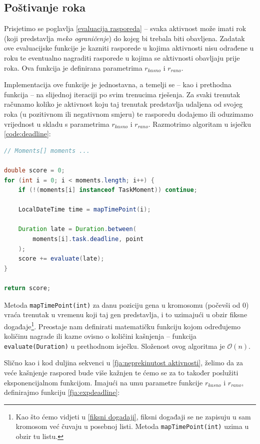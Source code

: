 \documentclass[times, utf8, zavrsni]{fer}
\begin{document}
\subsection{Poštivanje roka}\label{fja:postivanje roka}
Prisjetimo se poglavlja \ref{evaluacija rasporeda} -- svaka aktivnost može imati rok (koji predstavlja \textit{meko ograničenje}) do kojeg bi trebala biti obavljena. Zadatak ove evaluacijske funkcije je kazniti rasporede u kojima aktivnosti nisu odrađene u roku te eventualno nagraditi rasporede u kojima se aktivnosti obavljaju prije roka. Ova funkcija je definirana parametrima $r_{kasno}$ i $r_{rano}$.

Implementacija ove funkcije je jednostavna, a temelji se -- kao i prethodna funkcija -- na slijednoj iteraciji po svim trenucima rješenja. Za svaki trenutak računamo koliko je aktivnost koju taj trenutak predstavlja udaljena od svojeg roka (u pozitivnom ili negativnom smjeru) te rasporedu dodajemo ili oduzimamo vrijednost u skladu s parametrima $r_{kasno}$ i $r_{rano}$. Razmotrimo algoritam u isječku \ref{code:deadline}:

\begin{lstlisting}[language=java, caption=Algoritam određivanja kašnjenja trenutaka, label={code:deadline}]
// Moments[] moments ...

double score = 0;
for (int i = 0; i < moments.length; i++) {
    if (!(moments[i] instanceof TaskMoment)) continue;

    LocalDateTime time = mapTimePoint(i);

    Duration late = Duration.between(
    	moments[i].task.deadline, point
    );
    score += evaluate(late);
}

return score;
\end{lstlisting}
Metoda \texttt{mapTimePoint(int)} za danu poziciju gena u kromosomu (počevši od 0) vraća trenutak u vremenu koji taj gen predstavlja, i to uzimajući u obzir fiksne događaje\footnote{Kao što ćemo vidjeti u \ref{fiksni dogadaji}, fiksni događaji se ne zapisuju u sam kromosom već čuvaju u posebnoj listi. Metoda \texttt{mapTimePoint(int)} uzima u obzir tu listu.}. Preostaje nam definirati matematičku funkciju kojom određujemo količinu nagrade ili kazne ovisno o količini kašnjenja -- funkcija \texttt{evaluate(Duration)} u prethodnom isječku. Složenost ovog algoritma je $\mathcal{O}(n)$.

Slično kao i kod duljina sekvenci u \ref{fja:neprekinutost aktivnosti}, želimo da za veće kašnjenje raspored bude više kažnjen te ćemo se za to također poslužiti eksponencijalnom funkcijom. Imajući na umu parametre funkcije $r_{kasno}$ i $r_{rano}$, definirajmo funkciju \ref{fja:expdeadline}:
\end{document}
